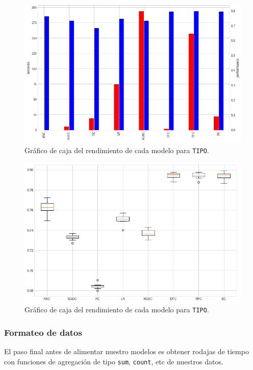 \documentclass[a4paper,12pt]{article}
\begin{document}
\begin{figure}[H]
	\begin{center}
	\includegraphics[width=1\textwidth]{tesis_71.png}
  	\caption{Gráfico de caja del rendimiento de cada modelo para \texttt{TIPO}.}
  	\label{fig:timesmodeluet}
  	\end{center}
\end{figure}

\begin{figure}[H]
	\begin{center}
	\includegraphics[width=1\textwidth]{tesis_72.png}
  	\caption{Gráfico de caja del rendimiento de cada modelo para \texttt{TIPO}.}
  	\label{fig:perfmodeluet}
  	\end{center}
\end{figure}

\subsubsection{Formateo de datos}
El paso final antes de alimentar nuestro modelos es obtener rodajas de tiempo con funciones de agregación de tipo \texttt{sum}, \texttt{count}, etc de nuestros datos. 
\end{document}
